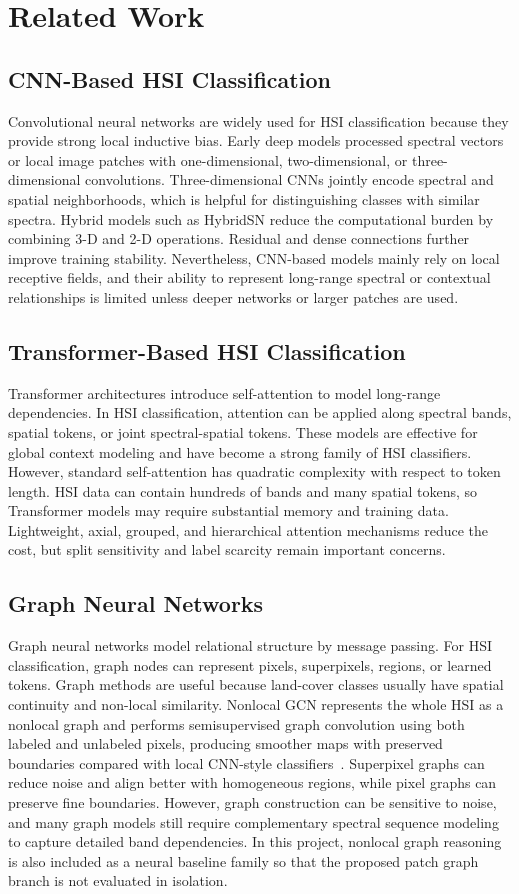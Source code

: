 \section{Related Work}
\subsection{CNN-Based HSI Classification}
Convolutional neural networks are widely used for HSI classification because they provide strong local inductive bias. Early deep models processed spectral vectors or local image patches with one-dimensional, two-dimensional, or three-dimensional convolutions. Three-dimensional CNNs jointly encode spectral and spatial neighborhoods, which is helpful for distinguishing classes with similar spectra. Hybrid models such as HybridSN reduce the computational burden by combining 3-D and 2-D operations. Residual and dense connections further improve training stability. Nevertheless, CNN-based models mainly rely on local receptive fields, and their ability to represent long-range spectral or contextual relationships is limited unless deeper networks or larger patches are used.

\subsection{Transformer-Based HSI Classification}
Transformer architectures introduce self-attention to model long-range dependencies. In HSI classification, attention can be applied along spectral bands, spatial tokens, or joint spectral-spatial tokens. These models are effective for global context modeling and have become a strong family of HSI classifiers. However, standard self-attention has quadratic complexity with respect to token length. HSI data can contain hundreds of bands and many spatial tokens, so Transformer models may require substantial memory and training data. Lightweight, axial, grouped, and hierarchical attention mechanisms reduce the cost, but split sensitivity and label scarcity remain important concerns.

\subsection{Graph Neural Networks}
Graph neural networks model relational structure by message passing. For HSI classification, graph nodes can represent pixels, superpixels, regions, or learned tokens. Graph methods are useful because land-cover classes usually have spatial continuity and non-local similarity. Nonlocal GCN represents the whole HSI as a nonlocal graph and performs semisupervised graph convolution using both labeled and unlabeled pixels, producing smoother maps with preserved boundaries compared with local CNN-style classifiers~\cite{mou2020nonlocalgcn}. Superpixel graphs can reduce noise and align better with homogeneous regions, while pixel graphs can preserve fine boundaries. However, graph construction can be sensitive to noise, and many graph models still require complementary spectral sequence modeling to capture detailed band dependencies. In this project, nonlocal graph reasoning is also included as a neural baseline family so that the proposed patch graph branch is not evaluated in isolation.

